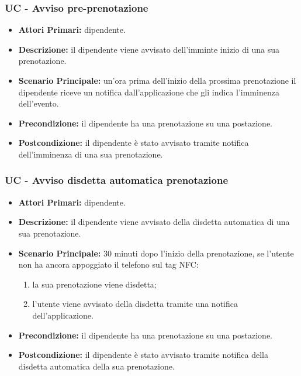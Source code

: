 \subsubsection{ UC - Avviso pre-prenotazione }
\begin{itemize}
	\item\textbf{Attori Primari:} dipendente.
	\item\textbf{Descrizione:} il dipendente viene avvisato dell'imminte inizio di una sua prenotazione.
	\item\textbf{Scenario Principale:} un'ora prima dell'inizio della prossima prenotazione il dipendente riceve un notifica dall'applicazione che gli indica l'imminenza dell'evento.
	\item\textbf{Precondizione:} il dipendente ha una prenotazione su una postazione.
	\item\textbf{Postcondizione:} il dipendente è stato avvisato tramite notifica dell'imminenza di una sua prenotazione.
\end{itemize}


\subsubsection{ UC - Avviso disdetta automatica prenotazione }
\begin{itemize}
	\item\textbf{Attori Primari:} dipendente.
	\item\textbf{Descrizione:} il dipendente viene avvisato della disdetta automatica di una sua prenotazione.
	\item\textbf{Scenario Principale:} 30 minuti dopo l'inizio della prenotazione, se l'utente non ha ancora appoggiato il telefono sul tag NFC:
	\begin{enumerate}
		\item la sua prenotazione viene disdetta;
		\item l'utente viene avvisato della disdetta tramite una notifica dell'applicazione.
	\end{enumerate}
	\item\textbf{Precondizione:} il dipendente ha una prenotazione su una postazione.
	\item\textbf{Postcondizione:} il dipendente è stato avvisato tramite notifica della disdetta automatica della sua prenotazione.
\end{itemize}


